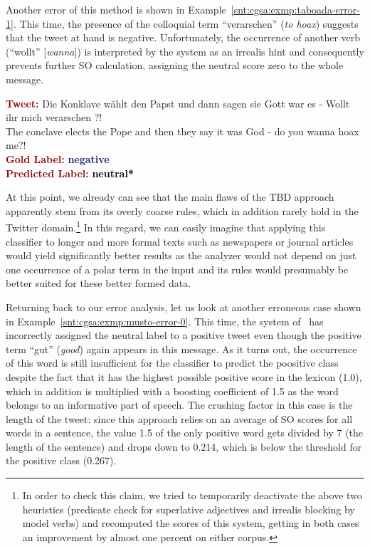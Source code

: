\noindent Another error of this method is shown in
Example~\ref{snt:cgsa:exmp:taboada-error-1}.  This time, the presence
of the colloquial term ``verarschen'' (\emph{to hoax}) suggests that
the tweet at hand is negative.  Unfortunately, the occurrence of
another verb (``wollt'' [\emph{wanna}]) is interpreted by the system
as an irrealis hint and consequently prevents further SO calculation,
assigning the neutral score zero to the whole message.

\begin{example}\label{snt:cgsa:exmp:taboada-error-1}
  \noindent\textup{\bfseries\textcolor{darkred}{Tweet:}} {\upshape Die Konklave w\"ahlt den Papst und dann sagen sie Gott war es - Wollt ihr mich verarschen ?!}\\
  \noindent The conclave elects the Pope and then they say it was God - do you wanna hoax me?!\\[\exampleSep]
  \noindent\textup{\bfseries\textcolor{darkred}{Gold Label:}}\hspace*{4.3em}\textbf{%
    \upshape\textcolor{midnightblue}{negative}}\\
 \noindent\textup{\bfseries\textcolor{darkred}{Predicted Label:}}\hspace*{2em}\textbf{%
    \upshape\textcolor{black}{neutral*}}
\end{example}

At this point, we already can see that the main flaws of the TBD
approach apparently stem from its overly coarse rules, which in
addition rarely hold in the Twitter domain.\footnote{In order to check
  this claim, we tried to temporarily deactivate the above two
  heuristics (predicate check for superlative adjectives and irrealis
  blocking by model verbs) and recomputed the scores of this system,
  getting in both cases an improvement by almost one percent on either
  corpus.}  In this regard, we can easily imagine that applying this
classifier to longer and more formal texts such as newspapers or
journal articles would yield significantly better results as the
analyzer would not depend on just one occurrence of a polar term in
the input and its rules would presumably be better suited for these
better formed data.

Returning back to our error analysis, let us look at another erroneous
case shown in Example~\ref{snt:cgsa:exmp:musto-error-0}. This time,
the system of~\citet{Musto:14} has incorrectly assigned the neutral
label to a positive tweet even though the positive term ``gut''
(\emph{good}) again appears in this message.  As it turns out, the
occurrence of this word is still insufficient for the classifier to
predict the poositive class despite the fact that it has the highest
possible positive score in the lexicon (1.0), which in addition is
multiplied with a boosting coefficient of 1.5 as the word belongs to
an informative part of speech.  The crushing factor in this case is
the length of the tweet: since this approach relies on an average of
SO scores for all words in a sentence, the value 1.5 of the only
positive word gets divided by 7 (the length of the sentence) and drops
down to 0.214, which is below the threshold for the positive class
(0.267).

